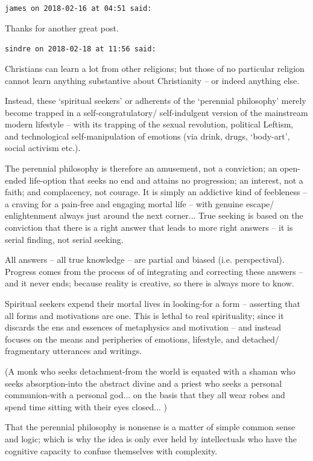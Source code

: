 \begin{footnotesize}
\begin{sffamily}
\texttt{james on 2018-02-16 at 04:51 said:}

Thanks for another great post.

\hfill

\texttt{sindre on 2018-02-18 at 11:56 said:}

Christians can learn a lot from other religions; but those of no particular religion cannot learn anything substantive about Christianity -- or indeed anything else.

Instead, these `spiritual seekers' or adherents of the `perennial philosophy' merely become trapped in a self-congratulatory/ self-indulgent version of the mainstream modern lifestyle -- with its trapping of the sexual revolution, political Leftism, and technological self-manipulation of emotions (via drink, drugs, `body-art', social activism etc.).

The perennial philosophy is therefore an amusement, not a conviction; an open-ended life-option that seeks no end and attains no progression; an interest, not a faith; and complacency, not courage. It is simply an addictive kind of feebleness -- a craving for a pain-free and engaging mortal life -- with genuine escape/ enlightenment always just around the next corner... True seeking is based on the conviction that there is a right answer that leads to more right answers -- it is serial finding, not serial seeking.

All answers -- all true knowledge -- are partial and biased (i.e. perspectival). Progress comes from the process of of integrating and correcting these answers -- and it never ends; because reality is creative, so there is always more to know.

Spiritual seekers expend their mortal lives in looking-for a form -- asserting that all forms and motivations are one. This is lethal to real spirituality; since it discards the ens and essences of metaphysics and motivation -- and instead focuses on the means and peripheries of emotions, lifestyle, and detached/ fragmentary utterances and writings.

(A monk who seeks detachment-from the world is equated with a shaman who seeks absorption-into the abstract divine and a priest who seeks a personal communion-with a personal god... on the basis that they all wear robes and spend time sitting with their eyes closed... )

That the perennial philosophy is nonsense is a matter of simple common sense and logic; which is why the idea is only ever held by intellectuals who have the cognitive capacity to confuse themselves with complexity.


\end{sffamily}
\end{footnotesize}
